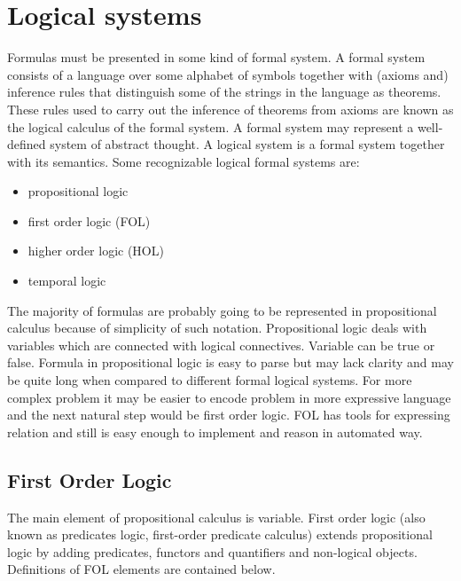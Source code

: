 \chapter{Logical systems}

Formulas must be presented in some kind of formal system. A formal system consists of a language over some alphabet of symbols together with (axioms and) inference rules that distinguish some of the strings in the language as theorems. These rules used to carry out the inference of theorems from axioms are known as the logical calculus of the formal system. A formal system may represent a well-defined system of abstract thought. A logical system is a formal system together with its semantics. Some recognizable logical formal systems are:

\begin{itemize}
  \item propositional logic 
  \item first order logic (FOL)
  \item higher order logic (HOL)
  \item temporal logic 
\end{itemize}

The majority of formulas are probably going to be represented in propositional calculus because of simplicity of such notation. Propositional logic deals with variables which are connected with logical connectives. Variable can be true or false. Formula in propositional logic is easy to parse but may lack clarity and may be quite long when compared to different formal logical systems. For more complex problem it may be easier to encode problem in more expressive language and the next natural step would be first order logic. \gls{FOL} has tools for expressing relation and still is easy enough to implement and reason in automated way. 

\section{First Order Logic}

The main element of propositional calculus is variable. First order logic (also known as predicates logic, first-order predicate calculus) extends propositional logic by adding predicates, functors and quantifiers and non-logical objects. Definitions of FOL elements are contained below.

